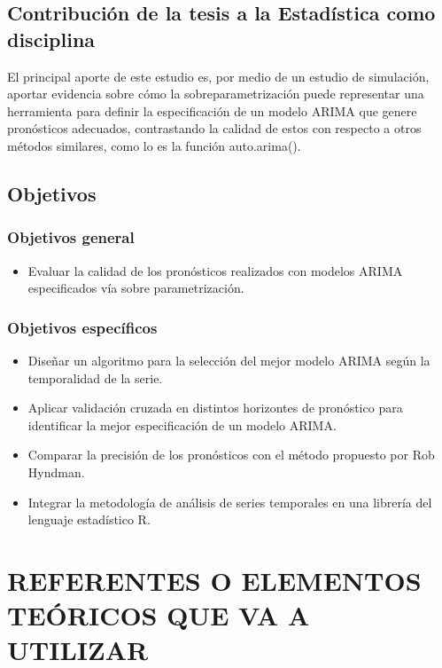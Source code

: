 \documentclass[]{article}
\providecommand{\tightlist}{%
  \setlength{\itemsep}{0pt}\setlength{\parskip}{0pt}}
\begin{document}
\subsection{Contribución de la tesis a la Estadística como disciplina}

El principal aporte de este estudio es, por medio de un estudio de
simulación, aportar evidencia sobre cómo la sobreparametrización puede
representar una herramienta para definir la especificación de un modelo
ARIMA que genere pronósticos adecuados, contrastando la calidad de estos
con respecto a otros métodos similares, como lo es la función
auto.arima().

\subsection{Objetivos}

\subsubsection{Objetivos general}

\begin{itemize}
\tightlist
\item
  Evaluar la calidad de los pronósticos realizados con modelos ARIMA
  especificados vía sobre parametrización.
\end{itemize}

\subsubsection{Objetivos específicos}

\begin{itemize}
\tightlist
\item
  Diseñar un algoritmo para la selección del mejor modelo ARIMA según la
  temporalidad de la serie.
\item
  Aplicar validación cruzada en distintos horizontes de pronóstico para
  identificar la mejor especificación de un modelo ARIMA.
\item
  Comparar la precisión de los pronósticos con el método propuesto por
  Rob Hyndman.
\item
  Integrar la metodología de análisis de series temporales en una
  librería del lenguaje estadístico R.
\end{itemize}

\section{REFERENTES O ELEMENTOS TEÓRICOS QUE VA A UTILIZAR}
\end{document}
